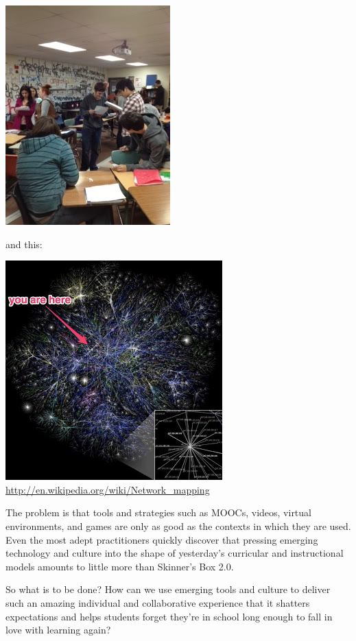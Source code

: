 \begin{center}
\includegraphics{../pictures/in_class.jpg}
\end{center}

and this:

\begin{center}
\includegraphics{../pictures/you_here.jpg}
\url{http://en.wikipedia.org/wiki/Network_mapping}
\end{center}


The problem is that tools and strategies such as MOOCs, videos,
virtual environments, and games are only as good as the contexts in
which they are used.  Even the most adept practitioners quickly
discover that pressing emerging technology and culture into the shape
of yesterday's curricular and instructional models amounts to little
more than Skinner's Box 2.0.

So what is to be done? How can we use emerging tools and culture to
deliver such an amazing individual and collaborative experience that it
shatters expectations and helps students forget they're in school long
enough to fall in love with learning again?


